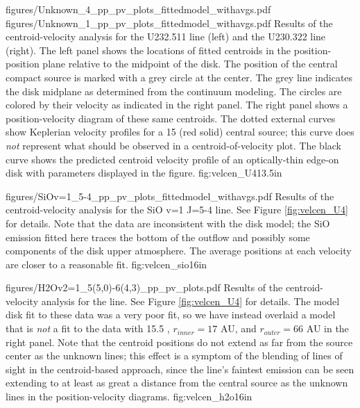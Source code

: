 \documentclass[twocolumn]{aastex62}
\begin{document}
\FigureTwo
{figures/Unknown_4_pp_pv_plots_fittedmodel_withavgs.pdf}
{figures/Unknown_1_pp_pv_plots_fittedmodel_withavgs.pdf}
{Results of the centroid-velocity analysis for the U232.511 line (left) and the U230.322 line (right).
The left panel shows the locations of fitted centroids in the position-position
plane relative to the midpoint of the disk.  
The position of the central compact source is
marked with a grey circle at the center.  The grey line indicates the disk
midplane as determined from the continuum modeling.  The circles are colored by
their velocity as indicated in
the right panel.  The right panel shows a position-velocity diagram of these
same centroids.  The dotted external curves show Keplerian velocity profiles
for a  15 \msun (red solid) central source; this curve does \emph{not} represent
what should be observed in a centroid-of-velocity plot.
The black curve shows the predicted centroid velocity profile of an
optically-thin edge-on disk with parameters displayed in the figure.
}
{fig:velcen_U4}{1}{3.5in}

\Figure
{figures/SiOv=1_5-4_pp_pv_plots_fittedmodel_withavgs.pdf}
{Results of the centroid-velocity analysis for the SiO v=1 J=5-4 line.
See Figure \ref{fig:velcen_U4} for details.
Note that the data are inconsistent with the disk model;
the SiO emission fitted here traces the bottom of the outflow
and possibly some components of the disk upper atmosphere.
The average positions at each velocity are closer to a reasonable fit.
}
{fig:velcen_sio}{1}{6in}

\Figure
{figures/H2Ov2=1_5(5,0)-6(4,3)_pp_pv_plots.pdf}
{Results of the centroid-velocity analysis for the \water line.
See Figure \ref{fig:velcen_U4} for details.
The model disk fit to these data was a very poor fit, so we
have instead overlaid a model that is \emph{not} a fit to the data
with 15.5 \msun, $r_{inner}=17$ AU, and $r_{outer}=66$ AU in the
right panel.
Note that the centroid positions do not extend as far from
the source center as the unknown lines; this effect is 
a symptom of the blending of lines of sight in the centroid-based approach,
since the \water line's faintest emission can be seen extending to at least as
great a distance from the central source as the unknown lines in the
position-velocity diagrams.
}
{fig:velcen_h2o}{1}{6in}
\end{document}
